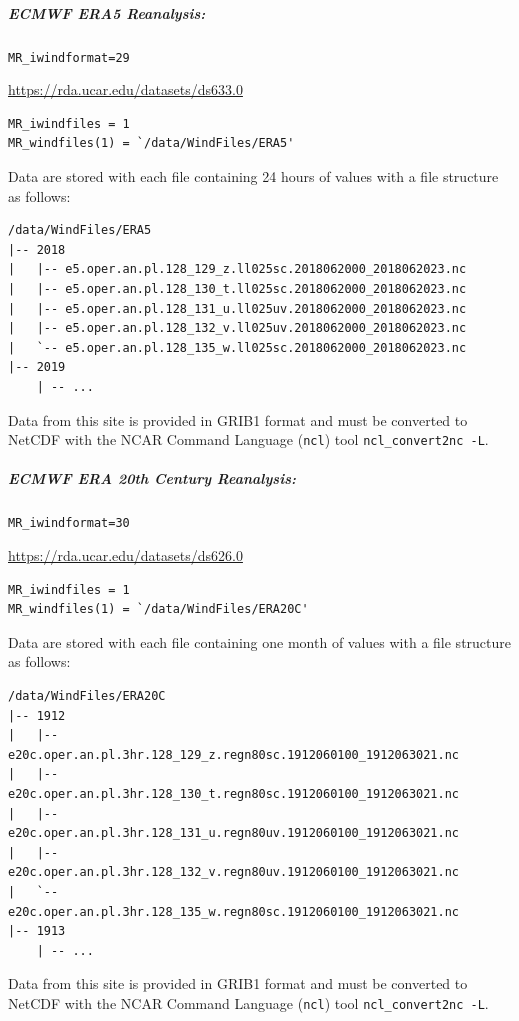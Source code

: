 \documentclass[11pt]{article}   %
\begin{document}
\subparagraph{ECMWF ERA5 Reanalysis:}
\texttt{MR\_iwindformat=29}

\url{https://rda.ucar.edu/datasets/ds633.0}
\begin{verbatim}
MR_iwindfiles = 1
MR_windfiles(1) = `/data/WindFiles/ERA5'
\end{verbatim}
Data are stored with each file containing 24 hours of values with a file structure as follows:
\begin{verbatim}
/data/WindFiles/ERA5
|-- 2018
|   |-- e5.oper.an.pl.128_129_z.ll025sc.2018062000_2018062023.nc
|   |-- e5.oper.an.pl.128_130_t.ll025sc.2018062000_2018062023.nc
|   |-- e5.oper.an.pl.128_131_u.ll025uv.2018062000_2018062023.nc
|   |-- e5.oper.an.pl.128_132_v.ll025uv.2018062000_2018062023.nc
|   `-- e5.oper.an.pl.128_135_w.ll025sc.2018062000_2018062023.nc
|-- 2019
    | -- ...
\end{verbatim}
Data from this site is provided in GRIB1 format and must be converted to NetCDF
with the NCAR Command Language (\texttt{ncl}) tool \texttt{ncl\_convert2nc -L}.

\subparagraph{ECMWF ERA 20th Century Reanalysis:}
\texttt{MR\_iwindformat=30}

\url{https://rda.ucar.edu/datasets/ds626.0}
\begin{verbatim}
MR_iwindfiles = 1
MR_windfiles(1) = `/data/WindFiles/ERA20C'
\end{verbatim}
Data are stored with each file containing one month of values with a file structure as follows:
\begin{verbatim}
/data/WindFiles/ERA20C
|-- 1912
|   |-- e20c.oper.an.pl.3hr.128_129_z.regn80sc.1912060100_1912063021.nc
|   |-- e20c.oper.an.pl.3hr.128_130_t.regn80sc.1912060100_1912063021.nc
|   |-- e20c.oper.an.pl.3hr.128_131_u.regn80uv.1912060100_1912063021.nc
|   |-- e20c.oper.an.pl.3hr.128_132_v.regn80uv.1912060100_1912063021.nc
|   `-- e20c.oper.an.pl.3hr.128_135_w.regn80sc.1912060100_1912063021.nc
|-- 1913
    | -- ...
\end{verbatim}
Data from this site is provided in GRIB1 format and must be converted to NetCDF
with the NCAR Command Language (\texttt{ncl}) tool \texttt{ncl\_convert2nc -L}.
\end{document}
